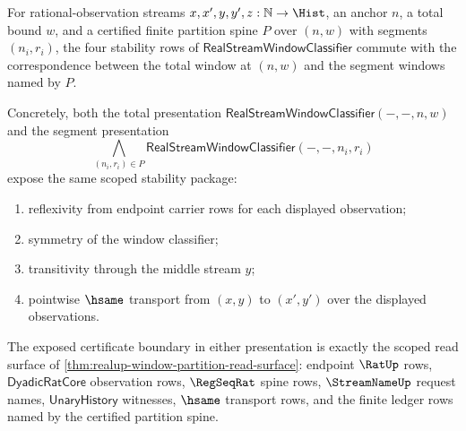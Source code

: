 \begin{theorem}
\label{thm:realup-window-partition-stability-package}
For rational-observation streams $x,x',y,y',z:\mathbb{N}\to\Hist$, an anchor
$n$, a total bound $w$, and a certified finite partition spine $P$ over
$(n,w)$ with segments $(n_i,r_i)$, the four stability rows of
$\mathsf{RealStreamWindowClassifier}$ commute with the correspondence between
the total window at $(n,w)$ and the segment windows named by $P$.

Concretely, both the total presentation
$\mathsf{RealStreamWindowClassifier}(-,-,n,w)$ and the segment presentation
$$
\bigwedge_{(n_i,r_i)\in P}
\mathsf{RealStreamWindowClassifier}(-,-,n_i,r_i)
$$
expose the same scoped stability package:
\begin{enumerate}
  \item reflexivity from endpoint carrier rows for each displayed observation;
  \item symmetry of the window classifier;
  \item transitivity through the middle stream $y$;
  \item pointwise $\hsame$ transport from $(x,y)$ to $(x',y')$ over the
  displayed observations.
\end{enumerate}
The exposed certificate boundary in either presentation is exactly the scoped
read surface of \autoref{thm:realup-window-partition-read-surface}: endpoint
$\RatUp$ rows, $\mathsf{DyadicRatCore}$ observation rows, $\RegSeqRat$ spine
rows, $\StreamNameUp$ request names, $\mathsf{UnaryHistory}$ witnesses,
$\hsame$ transport rows, and the finite ledger rows named by the certified
partition spine.
\end{theorem}
